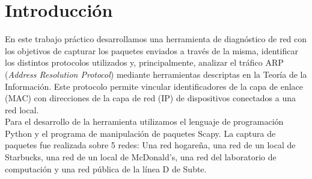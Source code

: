 \section{Introducción}

En este trabajo práctico desarrollamos una herramienta de diagnóstico de red con los objetivos de capturar los paquetes enviados a través de la misma, identificar los distintos protocolos utilizados y, principalmente, analizar el tráfico ARP (\textit{Address Resolution Protocol}) mediante herramientas descriptas en la Teoría de la Información. Este protocolo permite vincular identificadores de la capa de enlace (MAC) con direcciones de la capa de red (IP) de dispositivos conectados a una red local.\\

Para el desarrollo de la herramienta utilizamos el lenguaje de programación Python y el programa de manipulación de paquetes Scapy. La captura de paquetes fue realizada sobre 5 redes: Una red hogareña, una red de un local de Starbucks, una red de un local de McDonald's, una red del laboratorio de computación y una red pública de la línea D de Subte.

